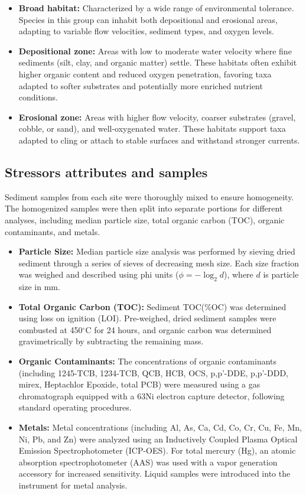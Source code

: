 \begin{itemize}
    \item \textbf{Broad habitat:} Characterized by a wide range of environmental tolerance. Species in this group can inhabit both depositional and erosional areas, adapting to variable flow velocities, sediment types, and oxygen levels.
    
    \item \textbf{Depositional zone:} Areas with low to moderate water velocity where fine sediments (silt, clay, and organic matter) settle. These habitats often exhibit higher organic content and reduced oxygen penetration, favoring taxa adapted to softer substrates and potentially more enriched nutrient conditions.
    
    \item \textbf{Erosional zone:} Areas with higher flow velocity, coarser substrates (gravel, cobble, or sand), and well-oxygenated water. These habitats support taxa adapted to cling or attach to stable surfaces and withstand stronger currents.
\end{itemize}





\subsection{Stressors attributes and samples}

Sediment samples from each site were thoroughly mixed to ensure homogeneity. The homogenized samples were then split into separate portions for different analyses, including median particle size, total organic carbon (TOC), organic contaminants, and metals.

\begin{itemize}
    \item \textbf{Particle Size:} Median particle size analysis was performed by sieving dried sediment through a series of sieves of decreasing mesh size. Each size fraction was weighed and described using phi units ($\phi = -\log_2 d$), where $d$ is particle size in mm.
    \item \textbf{Total Organic Carbon (TOC):} Sediment TOC(\%OC) was determined using loss on ignition (LOI). Pre-weighed, dried sediment samples were combusted at 450$^\circ$C for 24 hours, and organic carbon was determined gravimetrically by subtracting the remaining mass.
    \item \textbf{Organic Contaminants:} The concentrations of organic contaminants (including 1245-TCB, 1234-TCB, QCB, HCB, OCS, p,p'-DDE, p,p'-DDD, mirex, Heptachlor Epoxide, total PCB)
     were measured using a gas chromatograph equipped with a 63Ni electron capture detector, following standard operating procedures.
    \item \textbf{Metals:} Metal concentrations (including Al, As, Ca, Cd, Co, Cr, Cu, Fe, Mn, Ni, Pb, and Zn) were analyzed using an Inductively Coupled Plasma Optical Emission Spectrophotometer (ICP-OES). For total mercury (Hg), an atomic absorption spectrophotometer (AAS) was used with a vapor generation accessory for increased sensitivity. Liquid samples were introduced into the instrument for metal analysis.
\end{itemize}

